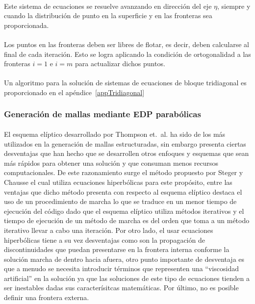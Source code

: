 \documentclass[letterpaper, openright, 12pt]{book}
\begin{document}
    \paragraph*{}
    Este sistema de ecuaciones se resuelve avanzando en dirección del eje
    $\eta$, siempre y cuando la distribución de punto en la superficie y en
    las fronteras sea proporcionada.

    \paragraph*{}
    Los puntos en las fronteras deben ser libres de flotar, es decir, deben
    calcularse al final de cada iteración. Esto se logra aplicando la
    condición de ortogonalidad a las fronteras $i = 1$ e $i = m$ para
    actualizar dichos puntos.

    \paragraph*{}
    Un algoritmo para la solución de sistemas de ecuaciones de bloque
    tridiagonal es proporcionado en el apéndice~\ref{appTridiagonal}

    \subsubsection{Generación de mallas mediante EDP parabólicas}
    \paragraph*{}
    El esquema elíptico desarrollado por Thompson et.\ al.
    \cite{thompson1974automatic} ha sido de los más utilizados en la
    generación de mallas estructuradas, sin embargo presenta ciertas
    desventajas que han hecho que se desarrollen otros enfoques y esquemas
    que sean más rápidos para obtener una solución y que consuman menos
    recursos computacionales. De este razonamiento surge el método propuesto
    por Steger y Chausse \cite{Hyperbolic-steger1980generation} el cual
    utiliza ecuaciones hiperbólicas para este propósito, entre las ventajas
    que dicho método presenta con respecto al esquema elíptico destaca el
    uso de un procedimiento de marcha lo que se traduce en un menor tiempo
    de ejecución del código dado que el esquema elíptico utiliza métodos
    iterativos y el tiempo de ejecución de un método de marcha es del orden
    que toma a un método iterativo llevar a cabo una iteración. Por otro
    lado, el usar ecuaciones hiperbólicas tiene a su vez desventajas como
    son la propagación de discontinuidades que puedan presentarse en la
    frontera interna conforme la solución marcha de dentro hacia afuera,
    otro punto importante de desventaja es que a menudo se necesita
    introducir términos que representen una ``viscosidad artificial'' en la
    solución ya que las soluciones de este tipo de ecuaciones tienden a ser
    inestables dadas sus caracterísitcas matemáticas. Por último, no es
    posible definir una frontera externa.
\end{document}
